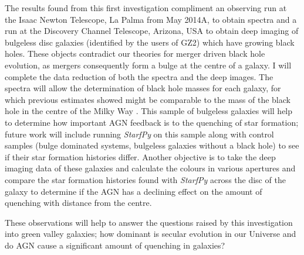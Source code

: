 \documentclass{mn2e}
\begin{document}
The results found from this first investigation compliment an observing run at the Isaac Newton Telescope, La Palma from May 2014A, to obtain spectra and a run at the Discovery Channel Telescope, Arizona, USA to obtain deep imaging of bulgeless disc galaxies (identified by the users of GZ2) which have growing black holes. These objects contradict our theories for merger driven black hole evolution, as mergers consequently form a bulge at the centre of a galaxy. I will complete the data reduction of both the spectra and the deep images. The spectra will allow the determination of black hole masses for each galaxy, for which previous estimates showed might be comparable to the mass of the black hole in the centre of the Milky Way \citep{Simmons13}. This sample of bulgeless galaxies will help to determine how important AGN feedback is to the quenching of star formation; future work will include running \emph{StarfPy} on this sample along with control samples (bulge dominated systems, bulgeless galaxies without a black hole) to see if their star formation histories differ. Another objective is to take the deep imaging data of these galaxies and calculate the colours in various apertures and compare the star formation histories found with \emph{StarfPy} across the disc of the galaxy to determine if the AGN has a declining effect on the amount of quenching with distance from the centre. 

These observations will help to answer the questions raised by this investigation into green valley galaxies; how dominant is secular evolution in our Universe and do AGN cause a significant amount of quenching in galaxies?
\end{document}
